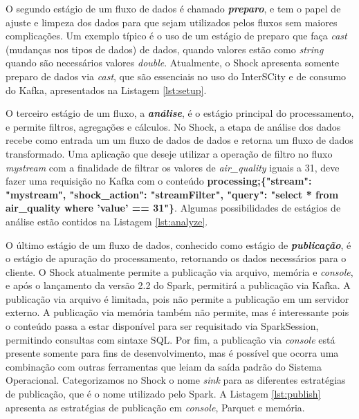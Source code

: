 

O segundo estágio de um fluxo de dados é chamado \textit{\textbf{preparo}}, e tem
o papel de ajuste e limpeza dos dados para que sejam utilizados pelos fluxos
sem maiores complicações. Um exemplo típico é o uso de um estágio de preparo
que faça \textit{cast} (mudanças nos tipos de dados) de dados, quando valores estão como
\textit{string} quando são necessários valores \textit{double}. Atualmente,
o Shock apresenta somente preparo de dados via \textit{cast}, que são essenciais
no uso do InterSCity e de consumo do Kafka, apresentados na Listagem
\ref{lst:setup}.



O terceiro estágio de um fluxo, a \textit{\textbf{análise}}, é o
estágio principal do processamento, e permite filtros, agregações e cálculos.
No Shock, a etapa de análise dos dados recebe como entrada um um fluxo de dados
de dados e retorna um fluxo de dados transformado. Uma aplicação que deseje
utilizar a operação de filtro no fluxo \textit{mystream} com a finalidade
de filtrar os valores de \textit{air\_quality} iguais a 31, deve fazer uma
requisição no Kafka com o conteúdo \small{\textbf{processing;\{"stream": "mystream",
"shock\_action": "streamFilter", "query": "select * from air\_quality where
'value' == 31"\}}}. Algumas possibilidades de estágios de análise
estão contidos na Listagem \ref{lst:analyze}.



O último estágio de um fluxo de dados, conhecido como estágio de
\textit{\textbf{publicação}}, é o estágio
de apuração do processamento, retornando os dados necessários para o cliente.
O Shock atualmente permite a publicação via arquivo, memória e \textit{console}, e após o
lançamento da versão 2.2 do Spark, permitirá a publicação via Kafka. A
publicação via arquivo é limitada, pois não permite a publicação em um servidor
externo. A publicação via memória também não permite, mas é interessante pois
o conteúdo passa a estar disponível para ser requisitado via SparkSession,
permitindo consultas com sintaxe SQL. Por fim, a publicação via \textit{console} está
presente somente para fins de desenvolvimento, mas é possível que ocorra uma
combinação com outras ferramentas que leiam da saída padrão do Sistema Operacional.
Categorizamos no Shock o nome \textit{sink} para as diferentes estratégias de
publicação, que é o nome utilizado pelo Spark. A Listagem \ref{lst:publish}
apresenta as estratégias de publicação em \textit{console}, Parquet e memória.

